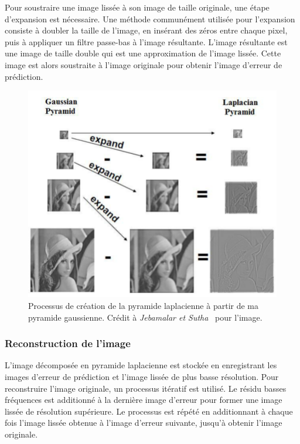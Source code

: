 \bigskip

Pour soustraire une image lissée à son image de taille originale, une étape d'expansion est nécessaire. Une méthode communément utilisée pour l'expansion consiste à doubler la taille de l'image, en insérant des zéros entre chaque pixel, puis à appliquer un filtre passe-bas à l'image résultante. L'image résultante est une image de taille double qui est une approximation de l'image lissée. Cette image est alors soustraite à l'image originale pour obtenir l'image d'erreur de prédiction.

\begin{figure}
    \centering
    \includegraphics[width=.75\textwidth]{contenu/resources/images/gauss_laplace_pyramid}
    \caption[Relation entre pyramide gaussienne et laplacienne]{Processus de création de la pyramide laplacienne à partir de ma pyramide gaussienne. Crédit à \textit{Jebamalar et Sutha}~\cite{jebamalar_design_2014} pour l'image.}
    \label{fig:gauss-laplace-pyramid}
\end{figure}

\subsubsection{Reconstruction de l'image}

L'image décomposée en pyramide laplacienne est stockée en enregistrant les images d'erreur de prédiction et l'image lissée de plus basse résolution. Pour reconstruire l'image originale, un processus itératif est utilisé. Le résidu basses fréquences est additionné à la dernière image d'erreur pour former une image lissée de résolution supérieure. Le processus est répété en additionnant à chaque fois l'image lissée obtenue à l'image d'erreur suivante, jusqu'à obtenir l'image originale.

